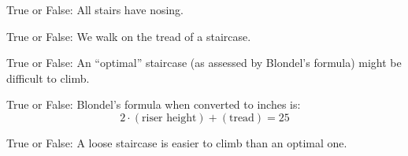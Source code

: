 \documentclass[noauthor,nooutcomes]{ximera}
\author{Claire Merriman and Bart Snapp}
\begin{document}
\maketitle



\begin{exercise}
  True or False: All stairs have nosing.
\end{exercise}


\begin{exercise}
   True or False: We walk on the tread of a staircase.
\end{exercise}


\begin{exercise} True or False: 
  An ``optimal'' staircase (as assessed by Blondel's formula) might be difficult to climb.
\end{exercise}

\begin{exercise} True or False: 
  Blondel's formula when converted to inches is:
  \[
  2\cdot (\text{riser height}) + (\text{tread})=25 
  \]
\end{exercise}

\begin{exercise} True or False: 
  A loose staircase is easier to climb than an optimal one.
\end{exercise}

\end{document}
